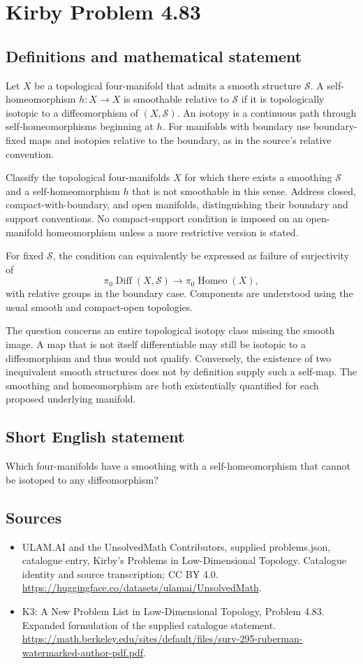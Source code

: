 \documentclass[11pt,a4paper]{article}
\begin{document}
\section*{Kirby Problem 4.83}\label{statement}

\subsection{Definitions and mathematical statement}
Let $X$ be a topological four-manifold that admits a smooth structure $\mathcal S$. A self-homeomorphism $h:X\to X$ is smoothable relative to $\mathcal S$ if it is topologically isotopic to a diffeomorphism of $(X,\mathcal S)$. An isotopy is a continuous path through self-homeomorphisms beginning at $h$. For manifolds with boundary use boundary-fixed maps and isotopies relative to the boundary, as in the source's relative convention.

Classify the topological four-manifolds $X$ for which there exists a smoothing $\mathcal S$ and a self-homeomorphism $h$ that is not smoothable in this sense. Address closed, compact-with-boundary, and open manifolds, distinguishing their boundary and support conventions. No compact-support condition is imposed on an open-manifold homeomorphism unless a more restrictive version is stated.

For fixed $\mathcal S$, the condition can equivalently be expressed as failure of surjectivity of
\[
\pi_0\operatorname{Diff}(X,\mathcal S)
\longrightarrow\pi_0\operatorname{Homeo}(X),
\]
with relative groups in the boundary case. Components are understood using the usual smooth and compact-open topologies.

The question concerns an entire topological isotopy class missing the smooth image. A map that is not itself differentiable may still be isotopic to a diffeomorphism and thus would not qualify. Conversely, the existence of two inequivalent smooth structures does not by definition supply such a self-map. The smoothing and homeomorphism are both existentially quantified for each proposed underlying manifold.
\subsection{Short English statement}
Which four-manifolds have a smoothing with a self-homeomorphism that cannot be isotoped to any diffeomorphism?
\subsection{Sources}
\begin{itemize}
\item[S1] ULAM.AI and the UnsolvedMath Contributors, supplied problems.json, catalogue entry, Kirby's Problems in Low-Dimensional Topology. Catalogue identity and source transcription; CC BY 4.0.
\url{https://huggingface.co/datasets/ulamai/UnsolvedMath}.
\item[S2] K3: A New Problem List in Low-Dimensional Topology, Problem 4.83. Expanded formulation of the supplied catalogue statement.
\url{https://math.berkeley.edu/sites/default/files/surv-295-ruberman-watermarked-author-pdf.pdf}.
\end{itemize}
\end{document}
